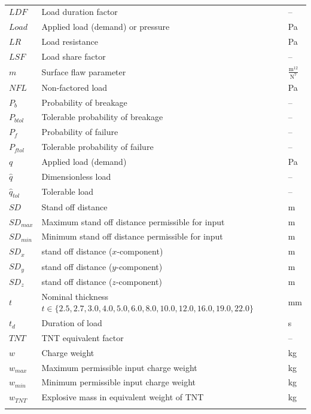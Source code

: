 \documentclass[12pt]{article}
\begin{document}
\begin{longtabu}{l X[l] l}
\\
$LDF$ & Load duration factor & --
\\
$Load$ & Applied load (demand) or pressure & Pa
\\
$LR$ & Load resistance & Pa
\\
$LSF$ & Load share factor & --
\\
$m$ & Surface flaw parameter & $\frac{\text{m}^{12}}{\text{N}^{7}}$
\\
$NFL$ & Non-factored load & Pa
\\
${P_{b}}$ & Probability of breakage & --
\\
${P_{btol}}$ & Tolerable probability of breakage & --
\\
${P_{f}}$ & Probability of failure & --
\\
${P_{ftol}}$ & Tolerable probability of failure & --
\\
$q$ & Applied load (demand) & Pa
\\
$\hat{q}$ & Dimensionless load & --
\\
${\hat{q}_{tol}}$ & Tolerable load & --
\\
$SD$ & Stand off distance & m
\\
${SD_{max}}$ & Maximum stand off distance permissible for input & m
\\
${SD_{min}}$ & Minimum stand off distance permissible for input & m
\\
${SD_{x}}$ & stand off distance ($x$-component) & m
\\
${SD_{y}}$ & stand off distance ($y$-component) & m
\\
${SD_{z}}$ & stand off distance ($z$-component) & m
\\
$t$ & Nominal thickness $t\in{}\{2.5,2.7,3.0,4.0,5.0,6.0,8.0,10.0,12.0,16.0,19.0,22.0\}$ & mm
\\
${t_{d}}$ & Duration of load & s
\\
$TNT$ & TNT equivalent factor & --
\\
$w$ & Charge weight & kg
\\
${w_{max}}$ & Maximum permissible input charge weight & kg
\\
${w_{min}}$ & Minimum permissible input charge weight & kg
\\
${w_{TNT}}$ & Explosive mass in equivalent weight of TNT & kg
\\
\bottomrule
\caption{}
\label{Table:ToS}
\end{longtabu}
\end{document}
